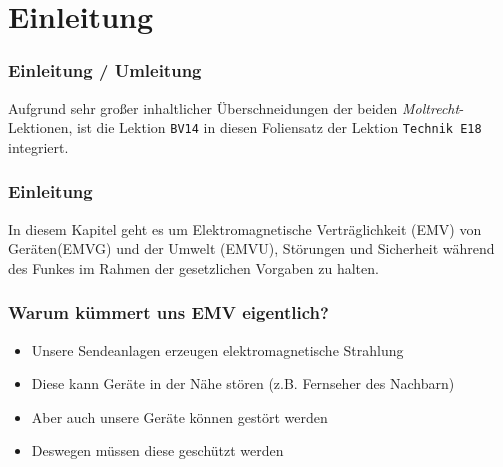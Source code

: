 

\subtitle{Technik Klasse E 18 \& Betriebstechnik/Vorschriften 14: \\
          EMV, EMVG, EMVU, Sicherheit \& Störungen  \\[2em]}
\date{Stand 05.02.2015}



\section{Einleitung}

\begin{frame}
    \frametitle{Einleitung / Umleitung}

    Aufgrund sehr großer inhaltlicher Überschneidungen der beiden
    \emph{Moltrecht}-Lektionen, ist die Lektion
    \texttt{BV14}\hyperlink{refs}{\cite{bv14}} in diesen Foliensatz der Lektion
    \texttt{Technik E18}\hyperlink{refs}{\cite{e18}} integriert. \\[2em]
\end{frame}

\begin{frame}
	\frametitle{Einleitung}
	In diesem Kapitel geht es um Elektromagnetische Verträglichkeit (EMV) von Geräten(EMVG) und 	der Umwelt (EMVU), Störungen und Sicherheit während des Funkes im Rahmen der gesetzlichen 		Vorgaben zu halten.
\end{frame}

\begin{frame}
	\frametitle{Warum kümmert uns EMV eigentlich?}
	\begin{itemize}
		\item Unsere Sendeanlagen erzeugen elektromagnetische Strahlung
		\item Diese kann Geräte in der Nähe stören (z.B. Fernseher des Nachbarn)
		\item Aber auch unsere Geräte können gestört werden
		\item Deswegen müssen diese geschützt werden
	\end{itemize}
\end{frame}


